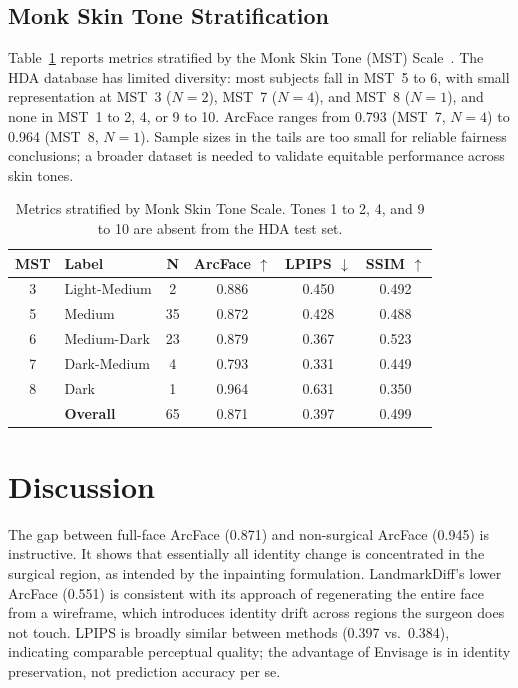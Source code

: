 \documentclass[runningheads]{llncs}
\newcommand{\method}{Envisage}
\begin{document}
\subsection{Monk Skin Tone Stratification}

Table~\ref{tab:fairness} reports metrics stratified by the Monk Skin Tone
(MST) Scale~\cite{monk2023monk}. The HDA database has limited diversity:
most subjects fall in MST~5 to 6, with small representation at MST~3
($N{=}2$), MST~7 ($N{=}4$), and MST~8 ($N{=}1$), and none in
MST~1 to 2, 4, or 9 to 10. ArcFace ranges from 0.793 (MST~7, $N{=}4$) to
0.964 (MST~8, $N{=}1$). Sample sizes in the tails are too small for
reliable fairness conclusions; a broader dataset is needed to validate
equitable performance across skin tones.

\begin{table}[t]
\centering
\caption{Metrics stratified by Monk Skin Tone Scale. Tones 1 to 2, 4, and 9 to 10
are absent from the HDA test set.}
\label{tab:fairness}
\begin{tabular}{@{}clcccc@{}}
\toprule
\textbf{MST} & \textbf{Label} & \textbf{N} &
\textbf{ArcFace} $\uparrow$ & \textbf{LPIPS} $\downarrow$ &
\textbf{SSIM} $\uparrow$ \\
\midrule
3  & Light-Medium & 2  & 0.886 & 0.450 & 0.492 \\
5  & Medium       & 35 & 0.872 & 0.428 & 0.488 \\
6  & Medium-Dark  & 23 & 0.879 & 0.367 & 0.523 \\
7  & Dark-Medium  & 4  & 0.793 & 0.331 & 0.449 \\
8  & Dark         & 1  & 0.964 & 0.631 & 0.350 \\
\midrule
   & \textbf{Overall} & 65 & 0.871 & 0.397 & 0.499 \\
\bottomrule
\end{tabular}
\end{table}

\section{Discussion}
\label{sec:discussion}

The gap between full-face ArcFace (0.871) and non-surgical ArcFace
(0.945) is instructive. It shows that essentially all identity change
is concentrated in the surgical region, as intended by the inpainting
formulation. LandmarkDiff's lower ArcFace
(0.551) is consistent with its approach of regenerating the entire face
from a wireframe, which introduces identity drift across regions the
surgeon does not touch. LPIPS is broadly similar between methods (0.397
vs.\ 0.384), indicating comparable perceptual quality; the advantage of
\method{} is in identity preservation, not prediction accuracy per se.
\end{document}
